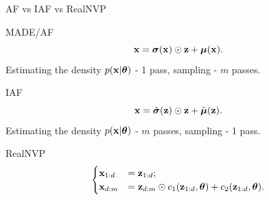 \begin{frame}{AF vs IAF vs RealNVP}
	\begin{block}{MADE/AF}
		\vspace{-0.5cm}
		\[
		\mathbf{x} = \boldsymbol{\sigma} (\mathbf{x}) \odot \mathbf{z} + \boldsymbol{\mu}(\mathbf{x}).
		\]
		Estimating the density $p(\mathbf{x} | \boldsymbol{\theta})$ - 1 pass, sampling - $m$ passes.
	\end{block}
	\begin{block}{IAF}
		\vspace{-0.5cm}
		\[
		\mathbf{x} = \tilde{\boldsymbol{\sigma}} (\mathbf{z}) \odot \mathbf{z} + \tilde{\boldsymbol{\mu}}(\mathbf{z}).
		\]
		Estimating the density $p(\mathbf{x} | \boldsymbol{\theta})$ - $m$ passes, sampling - 1 pass.
	\end{block}
	\begin{block}{RealNVP}
		\vspace{-0.2cm}
		\[
		\begin{cases}
			\mathbf{x}_{1:d} &= \mathbf{z}_{1:d}; \\ 
			\mathbf{x}_{d:m} &= \mathbf{z}_{d:m} \odot c_1(\mathbf{z}_{1:d}, \boldsymbol{\theta}) + c_2(\mathbf{z}_{1:d}, \boldsymbol{\theta}).
		\end{cases}
		\]
		\vspace{-0.5cm}
	\end{block}
\end{frame}
